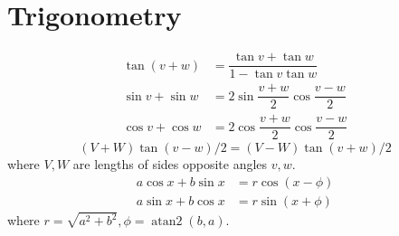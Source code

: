 







\section{Trigonometry}
\begin{align*}
\tan(v+w)&{}=\dfrac{\tan v+\tan w}{1-\tan v\tan w}\\
\sin v+\sin w&{}=2\sin\dfrac{v+w}{2}\cos\dfrac{v-w}{2}\\
\cos v+\cos w&{}=2\cos\dfrac{v+w}{2}\cos\dfrac{v-w}{2}
\end{align*}
\[ (V+W)\tan(v-w)/2{}=(V-W)\tan(v+w)/2 \]
where $V, W$ are lengths of sides opposite angles $v, w$.
\begin{align*}
	a\cos x+b\sin x&=r\cos(x-\phi)\\
	a\sin x+b\cos x&=r\sin(x+\phi)
\end{align*}
where $r=\sqrt{a^2+b^2}, \phi=\operatorname{atan2}(b,a)$.

